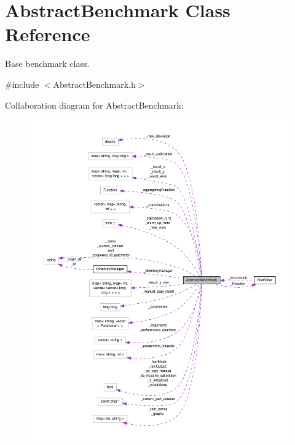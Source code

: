\hypertarget{classAbstractBenchmark}{\section{Abstract\-Benchmark Class Reference}
\label{classAbstractBenchmark}
}


Base benchmark class.  




{\ttfamily \#include $<$Abstract\-Benchmark.\-h$>$}



Collaboration diagram for Abstract\-Benchmark\-:\nopagebreak
\begin{figure}[H]
\begin{center}
\leavevmode
\includegraphics[width=350pt]{classAbstractBenchmark__coll__graph}
\end{center}
\end{figure}
